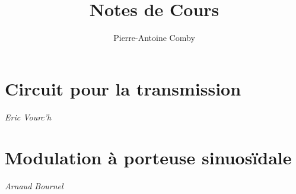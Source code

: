 \documentclass{../../cours}
\title{Notes de Cours}
\author{Pierre-Antoine Comby}
\begin{document}
\maketitle
\tableofcontents
\chapter{Circuit pour la transmission}
\emph{Eric Vourc'h}

\chapter{Modulation à porteuse sinuosïdale}
\emph{Arnaud Bournel}

\end{document}

